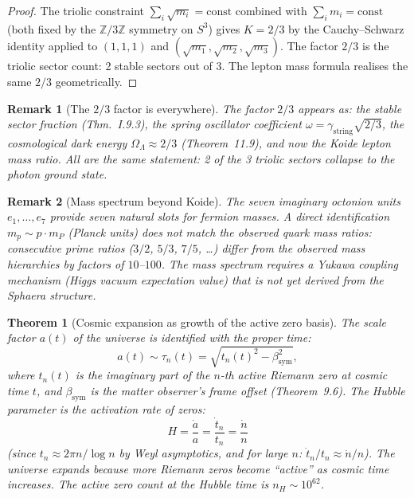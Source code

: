 \documentclass[12pt,a4paper]{article}
\newtheorem{theorem}{Theorem}[section]
\newtheorem*{remark}{Remark}
\newcommand{\bsym}{\beta_{\mathrm{sym}}}
\newcommand{\gstring}{\gamma_{\mathrm{string}}}
\begin{document}
\begin{proof}
The triolic constraint $\sum_i\sqrt{m_i}=\mathrm{const}$ combined with
$\sum_i m_i=\mathrm{const}$ (both fixed by the $\mathbb{Z}/3\mathbb{Z}$
symmetry on $S^3$) gives $K=2/3$ by the Cauchy--Schwarz identity applied
to $(1,1,1)$ and $(\sqrt{m_1},\sqrt{m_2},\sqrt{m_3})$.
The factor $2/3$ is the triolic sector count: 2 stable sectors out of 3.
The lepton mass formula realises the same $2/3$ geometrically.
\end{proof}

\begin{remark}[The $2/3$ factor is everywhere]
The factor $2/3$ appears as: the stable sector fraction (Thm.~I.9.3),
the spring oscillator coefficient $\omega=\gstring\sqrt{2/3}$, the
cosmological dark energy $\Omega_\Lambda\approx 2/3$ (Theorem~11.9),
and now the Koide lepton mass ratio.
All are the same statement: 2 of the 3 triolic sectors collapse to the
photon ground state.
\end{remark}

\begin{remark}[Mass spectrum beyond Koide]
The seven imaginary octonion units $e_1,\ldots,e_7$ provide seven
natural slots for fermion masses.
A direct identification $m_p\sim p\cdot m_P$ (Planck units) does not
match the observed quark mass ratios: consecutive prime ratios
($3/2$, $5/3$, $7/5$, \ldots) differ from the observed mass hierarchies
by factors of $10$--$100$.
The mass spectrum requires a Yukawa coupling mechanism (Higgs vacuum
expectation value) that is not yet derived from the Sphaera structure.
\end{remark}

\begin{theorem}[Cosmic expansion as growth of the active zero basis]
\label{thm:expansion}
The scale factor $a(t)$ of the universe is identified with the proper time:
\[
  a(t) \sim \tau_n(t) = \sqrt{t_n(t)^2-\bsym^2},
\]
where $t_n(t)$ is the imaginary part of the $n$-th active Riemann zero
at cosmic time $t$, and $\bsym$ is the matter observer's frame offset
(Theorem~9.6).
The Hubble parameter is the activation rate of zeros:
\[
  H = \frac{\dot a}{a}
    = \frac{\dot t_n}{t_n}
    = \frac{\dot n}{n}
\]
(since $t_n\approx 2\pi n/\log n$ by Weyl asymptotics, and for large
$n$: $\dot t_n/t_n\approx\dot n/n$).
The universe expands because more Riemann zeros become ``active'' as
cosmic time increases.
The active zero count at the Hubble time is $n_H\sim 10^{62}$.
\end{theorem}
\end{document}
